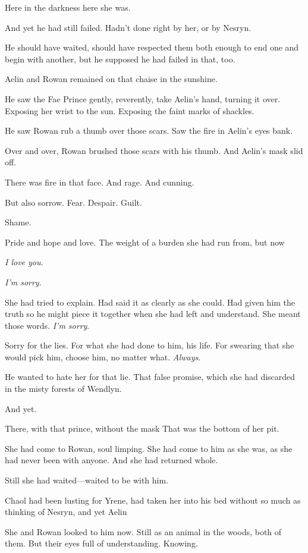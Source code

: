 Here in the darkness  here she was.

And yet he had still failed. Hadn't done right by her, or by Nesryn.

He should have waited, should have respected them both enough to end one and begin with another, but he supposed he had failed in that, too.

Aelin and Rowan remained on that chaise in the sunshine.

He saw the Fae Prince gently, reverently, take Aelin's hand, turning it over. Exposing her wrist to the sun. Exposing the faint marks of shackles.

He saw Rowan rub a thumb over those scars. Saw the fire in Aelin's eyes bank.

Over and over, Rowan brushed those scars with his thumb. And Aelin's mask slid off.

There was fire in that face. And rage. And cunning.

But also sorrow. Fear. Despair. Guilt.

Shame.

Pride and hope and love. The weight of a burden she had run from, but now



\emph{I love you.}

\emph{I'm sorry}.

She had tried to explain. Had said it as clearly as she could. Had given him the truth so he might piece it together when she had left and understand. She meant those words. \emph{I'm sorry}.

Sorry for the lies. For what she had done to him, his life. For swearing that she would pick him, choose him, no matter what. \emph{Always}.

He wanted to hate her for that lie. That false promise, which she had discarded in the misty forests of Wendlyn.

And yet.

There, with that prince, without the mask  That was the bottom of her pit.

She had come to Rowan, soul limping. She had come to him as she was, as she had never been with anyone. And she had returned whole.

Still she had waited---waited to be with him.

Chaol had been lusting for Yrene, had taken her into his bed without so much as thinking of Nesryn, and yet Aelin 

She and Rowan looked to him now. Still as an animal in the woods, both of them. But their eyes full of understanding. Knowing.

